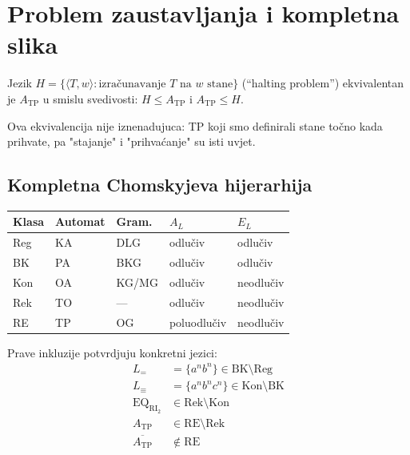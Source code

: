 \section{Problem zaustavljanja i kompletna slika}

\begin{propozicija}
Jezik $H = \{\langle T, w \rangle : \text{izračunavanje } T \text{ na } w \text{ stane}\}$
(``halting problem'') ekvivalentan je $A_\mathrm{TP}$ u smislu svedivosti:
$H \leq A_\mathrm{TP}$ i $A_\mathrm{TP} \leq H$.
\end{propozicija}

Ova ekvivalencija nije iznenadujuca: TP koji smo definirali stane
točno kada prihvate, pa "stajanje" i "prihvaćanje" su isti uvjet.

\subsection{Kompletna Chomskyjeva hijerarhija}

\begin{center}
\renewcommand{\arraystretch}{1.5}
\begin{tabular}{lllll}
\hline
\textbf{Klasa} & \textbf{Automat} & \textbf{Gram.} & \textbf{$A_L$} & \textbf{$E_L$} \\
\hline
Reg & KA & DLG & odlučiv & odlučiv \\
BK & PA & BKG & odlučiv & odlučiv \\
Kon & OA & KG/MG & odlučiv & neodlučiv \\
Rek & TO & --- & odlučiv & neodlučiv \\
RE & TP & OG & poluodlučiv & neodlučiv \\
\hline
\end{tabular}
\end{center}

Prave inkluzije potvrdjuju konkretni jezici:
\begin{align*}
  L_= &= \{a^n b^n\} \in \mathrm{BK} \setminus \mathrm{Reg} \\
  L_\equiv &= \{a^n b^n c^n\} \in \mathrm{Kon} \setminus \mathrm{BK} \\
  \mathrm{EQ}_\mathrm{RI_2} &\in \mathrm{Rek} \setminus \mathrm{Kon} \\
  A_\mathrm{TP} &\in \mathrm{RE} \setminus \mathrm{Rek} \\
  \overline{A_\mathrm{TP}} &\notin \mathrm{RE}
\end{align*}


